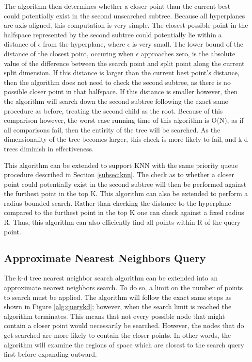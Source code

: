 The algorithm then determines whether a closer point than the current best could potentially exist in the second unsearched subtree.  Because all hyperplanes are axis aligned, this computation is very simple.  The closest possible point in the halfspace represented by the second subtree could potentially lie within a distance of $\epsilon$ from the hyperplane, where $\epsilon$ is very small.  The lower bound of the distance of the closest point, occuring when $\epsilon$ approaches zero, is the absolute value of the difference between the search point and split point along the current split dimension.  If this distance is larger than the current best point's distance, then the algorithm does not need to check the second subtree, as there is no possible closer point in that halfspace.  If this distance is smaller however, then the algorithm will search down the second subtree following the exact same procedure as before, treating the second child as the root.  Because of this comparison however, the worst case running time of this algorithm is O(N), as if all comparisons fail, then the entirity of the tree will be searched.  As the dimensionality of the tree becomes larger, this check is more likely to fail, and k-d trees diminish in effectiveness.

This algorithm can be extended to support KNN with the same priority queue procedure described in Section \ref{subsec:knn}.  The check as to whether a closer point could potentially exist in the second subtree will then be performed against the furthest point in the top K.  This algorithm can also be extended to perform a radius bounded search.  Rather than checking the distance to the hyperplane compared to the furthest point in the top K one can check against a fixed radius R.  Thus, this algorithm can also efficiently find all points within R of the query point.

\subsection{Approximate Nearest Neighbors Query}

The k-d tree nearest neighbor search algorithm can be extended into an approximate nearest neighbors search.  To do so, a limit on the number of points to search must be applied.  The algorithm will follow the exact same steps as shown in Figure \ref{alg:querykd}; however, when the search limit is reached the algorithm terminates.  This means that not every possible node that might contain a closer point would necessarily be searched.  However, the nodes that do get searched are more likely to contain the closer points.  In other words, the algorithm will examine the regions of space which are closest to the search query first before expanding outward.

